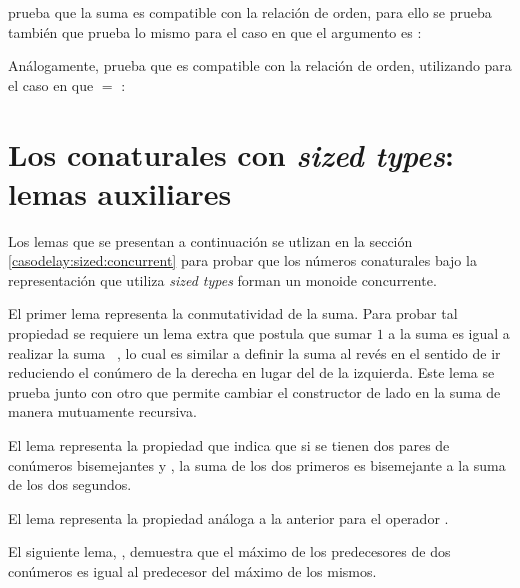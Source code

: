  prueba que la suma es compatible con la relación de orden, para ello se prueba también  que prueba lo mismo para el caso en que el argumento  es :

Análogamente,  prueba que  es compatible con la relación de orden, utilizando  para el caso en que  $=$ :

\section{Los conaturales con \textit{sized types}: lemas auxiliares}\label{apendice:lemassz}

Los lemas que se presentan a continuación se utlizan en la sección \ref{casodelay:sized:concurrent} para probar que los números conaturales bajo la representación que utiliza \textit{sized types} forman un monoide concurrente.

El primer lema representa la conmutatividad de la suma. Para probar tal propiedad se requiere un lema extra que postula que sumar $1$ a la suma  \AgdaFunction{+}   es igual a realizar la suma \hbox{ \AgdaFunction{+}  }, lo cual es similar a definir la suma al revés en el sentido de ir reduciendo el conúmero de la derecha en lugar del de la izquierda. Este lema se prueba junto con otro que permite cambiar el constructor  de lado en la suma de manera mutuamente recursiva.

El lema  representa la propiedad que indica que si se tienen dos pares de conúmeros bisemejantes  \AgdaFunction{$\sim$}  y  \AgdaFunction{$\sim$} , la suma de los dos primeros es bisemejante a la suma de los dos segundos.

El lema  representa la propiedad análoga a la anterior para el operador .

El siguiente lema, , demuestra que el máximo de los predecesores de dos conúmeros es igual al predecesor del máximo de los mismos.

